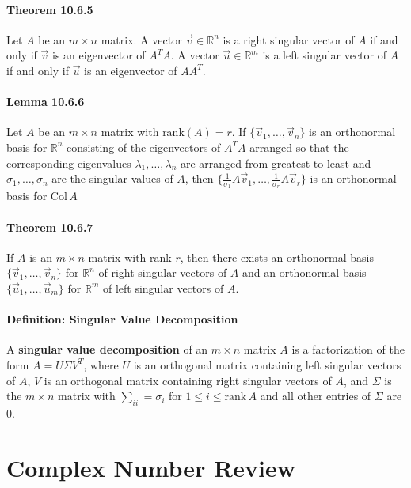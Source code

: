 \documentclass[10pt,letter]{article}
\begin{document}
\paragraph{Theorem 10.6.5}
Let $A$ be an $m\times n$ matrix. A vector $\vec{v}\in\mathbb{R}^n$ is a right singular vector of $A$ if and only if $\vec{v}$ is an eigenvector of $A^TA$. A vector $\vec{u}\in\mathbb{R}^m$ is a left singular vector of $A$ if and only if $\vec{u}$ is an eigenvector of $AA^T$. 
\paragraph{Lemma 10.6.6}
Let $A$ be an $m\times n$ matrix with $\text{rank}(A)=r$. If $\{\vec{v}_1,\ldots,\vec{v}_n\}$ is an orthonormal basis for $\mathbb{R}^n$ consisting of the eigenvectors of $A^TA$ arranged so that the corresponding eigenvalues $\lambda_1,\ldots,\lambda_n$ are arranged from greatest to least and $\sigma_1,\ldots,\sigma_n$ are the singular values of $A$, then $\{\frac{1}{\sigma_1}A\vec{v}_1,\ldots,\frac{1}{\sigma_r}A\vec{v}_r\}$ is an orthonormal basis for $\text{Col}\,A$
\paragraph{Theorem 10.6.7}
If $A$ is an $m\times n$ matrix with rank $r$, then there exists an orthonormal basis $\{\vec{v}_1,\ldots,\vec{v}_n\}$ for $\mathbb{R}^n$ of right singular vectors of $A$ and an orthonormal basis $\{\vec{u}_1,\ldots,\vec{u}_m\}$ for $\mathbb{R}^m$ of left singular vectors of $A$. 
\paragraph{Definition: Singular Value Decomposition}
A \textbf{singular value decomposition} of an $m\times n$ matrix $A$ is a factorization of the form $A=U\Sigma V^T$, where $U$ is an orthogonal matrix containing left singular vectors of $A$, $V$ is an orthogonal matrix containing right singular vectors of $A$, and $\Sigma$ is the $m\times n$ matrix with $\sum_{ii}=\sigma_i$ for $1\leq i\leq\text{rank}\,A$ and all other entries of $\Sigma$ are $0$. 

\section*{Complex Number Review}
\end{document}
